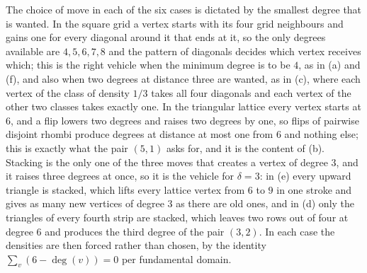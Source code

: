 \documentclass[10pt,a4paper]{article}
\begin{document}
The choice of move in each of the six cases is dictated by the smallest degree that is wanted. In
the square grid a vertex starts with its four grid neighbours and gains one for every diagonal around
it that ends at it, so the only degrees available are $4,5,6,7,8$ and the pattern of diagonals decides
which vertex receives which; this is the right vehicle when the minimum degree is to be $4$, as in
(a) and (f), and also when two degrees at distance three are wanted, as in (c), where each vertex of
the class of density $1/3$ takes all four diagonals and each vertex of the other two classes takes
exactly one. In the triangular lattice every vertex starts at $6$, and a flip lowers two degrees and
raises two degrees by one, so flips of pairwise disjoint rhombi produce degrees at distance at most
one from $6$ and nothing else; this is exactly what the pair $(5,1)$ asks for, and it is the content
of (b). Stacking is the
only one of the three moves that creates a vertex of degree $3$, and it raises three degrees at once,
so it is the vehicle for $\delta =3$: in (e) every upward triangle is stacked, which lifts every
lattice vertex from $6$ to $9$ in one stroke and gives as many new vertices of degree $3$ as there are
old ones, and in (d) only the triangles of every fourth strip are stacked, which leaves two rows out
of four at degree $6$ and produces the third degree of the pair $(3,2)$. In each case the densities
are then forced rather than chosen, by the identity $\sum_{v}(6-\deg (v))=0$ per fundamental domain.


%
\end{document}
